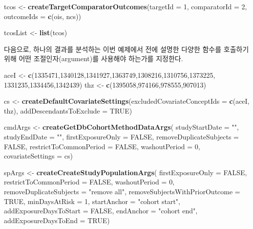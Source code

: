 \documentclass[11pt]{book}
\newenvironment{Shaded}{\begin{snugshade}}{\end{snugshade}}
\newcommand{\KeywordTok}[1]{\textcolor[rgb]{0.13,0.29,0.53}{\textbf{#1}}}
\newcommand{\DataTypeTok}[1]{\textcolor[rgb]{0.13,0.29,0.53}{#1}}
\newcommand{\DecValTok}[1]{\textcolor[rgb]{0.00,0.00,0.81}{#1}}
\newcommand{\StringTok}[1]{\textcolor[rgb]{0.31,0.60,0.02}{#1}}
\newcommand{\OtherTok}[1]{\textcolor[rgb]{0.56,0.35,0.01}{#1}}
\newcommand{\NormalTok}[1]{#1}
\theoremstyle{definition}
\theoremstyle{definition}
\theoremstyle{definition}
\theoremstyle{remark}
\begin{document}
\begin{Shaded}
\begin{Highlighting}[]
\NormalTok{tcos <-}\StringTok{ }\KeywordTok{createTargetComparatorOutcomes}\NormalTok{(}\DataTypeTok{targetId =} \DecValTok{1}\NormalTok{,}
                                       \DataTypeTok{comparatorId =} \DecValTok{2}\NormalTok{,}
                                       \DataTypeTok{outcomeIds =} \KeywordTok{c}\NormalTok{(ois, ncs))}

\NormalTok{tcosList <-}\StringTok{ }\KeywordTok{list}\NormalTok{(tcos)}
\end{Highlighting}
\end{Shaded}

다음으로, 하나의 결과를 분석하는 이번 예제에서 전에 설명한 다양한 함수를
호출하기 위해 어떤 조절인자(argument)를 사용해야 하는가를 지정한다.

\begin{Shaded}
\begin{Highlighting}[]
\NormalTok{aceI <-}\StringTok{ }\KeywordTok{c}\NormalTok{(}\DecValTok{1335471}\NormalTok{,}\DecValTok{1340128}\NormalTok{,}\DecValTok{1341927}\NormalTok{,}\DecValTok{1363749}\NormalTok{,}\DecValTok{1308216}\NormalTok{,}\DecValTok{1310756}\NormalTok{,}\DecValTok{1373225}\NormalTok{,}
          \DecValTok{1331235}\NormalTok{,}\DecValTok{1334456}\NormalTok{,}\DecValTok{1342439}\NormalTok{)}
\NormalTok{thz <-}\StringTok{ }\KeywordTok{c}\NormalTok{(}\DecValTok{1395058}\NormalTok{,}\DecValTok{974166}\NormalTok{,}\DecValTok{978555}\NormalTok{,}\DecValTok{907013}\NormalTok{)}

\NormalTok{cs <-}\StringTok{ }\KeywordTok{createDefaultCovariateSettings}\NormalTok{(}\DataTypeTok{excludedCovariateConceptIds =} \KeywordTok{c}\NormalTok{(aceI,}
\NormalTok{                                                                     thz),}
                                     \DataTypeTok{addDescendantsToExclude =} \OtherTok{TRUE}\NormalTok{)}

\NormalTok{cmdArgs <-}\StringTok{ }\KeywordTok{createGetDbCohortMethodDataArgs}\NormalTok{(}
  \DataTypeTok{studyStartDate =} \StringTok{""}\NormalTok{,}
  \DataTypeTok{studyEndDate =} \StringTok{""}\NormalTok{,}
  \DataTypeTok{firstExposureOnly =} \OtherTok{FALSE}\NormalTok{,}
  \DataTypeTok{removeDuplicateSubjects =} \OtherTok{FALSE}\NormalTok{,}
  \DataTypeTok{restrictToCommonPeriod =} \OtherTok{FALSE}\NormalTok{,}
  \DataTypeTok{washoutPeriod =} \DecValTok{0}\NormalTok{,}
  \DataTypeTok{covariateSettings =}\NormalTok{ cs)}

\NormalTok{spArgs <-}\StringTok{ }\KeywordTok{createCreateStudyPopulationArgs}\NormalTok{(}
  \DataTypeTok{firstExposureOnly =} \OtherTok{FALSE}\NormalTok{,}
  \DataTypeTok{restrictToCommonPeriod =} \OtherTok{FALSE}\NormalTok{,}
  \DataTypeTok{washoutPeriod =} \DecValTok{0}\NormalTok{,}
  \DataTypeTok{removeDuplicateSubjects =} \StringTok{"remove all"}\NormalTok{,}
  \DataTypeTok{removeSubjectsWithPriorOutcome =} \OtherTok{TRUE}\NormalTok{,}
  \DataTypeTok{minDaysAtRisk =} \DecValTok{1}\NormalTok{,}
  \DataTypeTok{startAnchor =} \StringTok{"cohort start"}\NormalTok{,}
  \DataTypeTok{addExposureDaysToStart =} \OtherTok{FALSE}\NormalTok{,}
  \DataTypeTok{endAnchor =} \StringTok{"cohort end"}\NormalTok{,}
  \DataTypeTok{addExposureDaysToEnd =} \OtherTok{TRUE}\NormalTok{)}


\end{Highlighting}
\end{Shaded}
\end{document}

